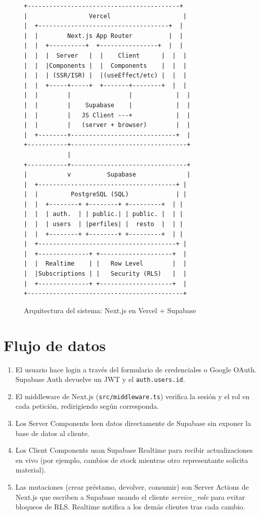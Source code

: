 \documentclass[12pt,a4paper,oneside]{report}
\newcommand{\file}[1]{\texttt{\color{cecyteDark}#1}}
\begin{document}
\begin{figure}[H]
\centering
\begin{verbatim}
+------------------------------------------+
|                 Vercel                    |
|  +------------------------------------+  |
|  |        Next.js App Router          |  |
|  |  +----------+  +----------------+  |  |
|  |  |  Server   |  |    Client      |  |  |
|  |  |Components |  |  Components    |  |  |
|  |  | (SSR/ISR) |  |(useEffect/etc) |  |  |
|  |  +-----+-----+  +-------+--------+  |  |
|  |        |                |            |  |
|  |        |    Supabase    |            |  |
|  |        |   JS Client ---+            |  |
|  |        |   (server + browser)        |  |
|  +--------+-----------------------------+  |
+-----------+--------------------------------+
            |
+-----------+--------------------------------+
|           v          Supabase              |
|  +--------------------------------------+ |
|  |         PostgreSQL (SQL)             | |
|  |  +--------+ +--------+ +---------+  | |
|  |  | auth.  | | public.| | public. |  | |
|  |  | users  | |perfiles| |  resto  |  | |
|  |  +--------+ +--------+ +---------+  | |
|  +--------------------------------------+ |
|  +--------------+ +--------------------+  |
|  |  Realtime    | |   Row Level        |  |
|  |Subscriptions | |   Security (RLS)   |  |
|  +--------------+ +--------------------+  |
+-------------------------------------------+
\end{verbatim}
\caption{Arquitectura del sistema: Next.js en Vercel + Supabase}
\end{figure}

\section{Flujo de datos}

\begin{enumerate}
  \item El usuario hace login a través del formulario de credenciales o Google OAuth. Supabase Auth devuelve un JWT y el \file{auth.users.id}.
  \item El middleware de Next.js (\file{src/middleware.ts}) verifica la sesión y el rol en cada petición, redirigiendo según corresponda.
  \item Los Server Components leen datos directamente de Supabase sin exponer la base de datos al cliente.
  \item Los Client Components usan Supabase Realtime para recibir actualizaciones en vivo (por ejemplo, cambios de stock mientras otro representante solicita material).
  \item Las mutaciones (crear préstamo, devolver, consumir) son Server Actions de Next.js que escriben a Supabase usando el cliente \textit{service\_role} para evitar bloqueos de RLS. Realtime notifica a los demás clientes tras cada cambio.
\end{enumerate}
\end{document}
